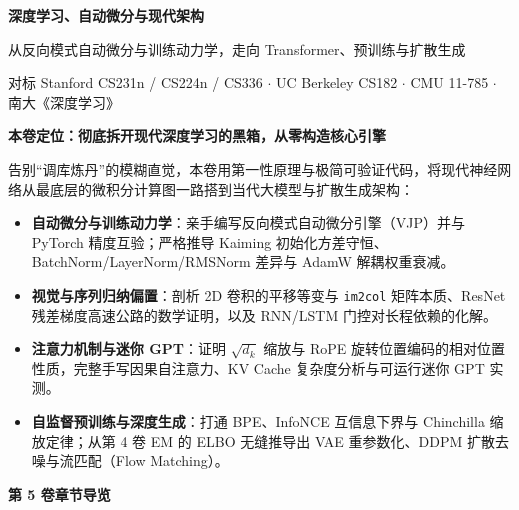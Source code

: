 \documentclass[UTF8,10.5pt,a4paper,oneside,fontset=fandol,scheme=plain]{ctexbook}
\begin{document}
{\fontsize{25}{33}\selectfont\sffamily\bfseries\color{ink}深度学习、自动微分与现代架构}\par
\vspace{2.5mm}
{\large\sffamily\color{teal}从反向模式自动微分与训练动力学，走向 Transformer、预训练与扩散生成}\par
\vspace{4.5mm}
{\small\color{slate}对标 Stanford CS231n / CS224n / CS336 $\cdot$ UC Berkeley CS182 $\cdot$ CMU 11-785 $\cdot$ 南大《深度学习》}\par

\vspace{5.5mm}

\begin{tcolorbox}[
  enhanced,
  colback=tealLight,
  colframe=tealLine,
  borderline west={2.6pt}{0pt}{tealDark},
  arc=2mm,
  boxrule=0.5pt,
  left=4.5mm,right=4.5mm,top=3mm,bottom=3mm
]
\textbf{\sffamily\color{tealDark}本卷定位：彻底拆开现代深度学习的黑箱，从零构造核心引擎}\par\vspace{1.2mm}
\small
告别“调库炼丹”的模糊直觉，本卷用第一性原理与极简可验证代码，将现代神经网络从最底层的微积分计算图一路搭到当代大模型与扩散生成架构：
\begin{itemize}
  \item \textbf{自动微分与训练动力学}：亲手编写反向模式自动微分引擎（VJP）并与 PyTorch 精度互验；严格推导 Kaiming 初始化方差守恒、BatchNorm/LayerNorm/RMSNorm 差异与 AdamW 解耦权重衰减。
  \item \textbf{视觉与序列归纳偏置}：剖析 2D 卷积的平移等变与 \texttt{im2col} 矩阵本质、ResNet 残差梯度高速公路的数学证明，以及 RNN/LSTM 门控对长程依赖的化解。
  \item \textbf{注意力机制与迷你 GPT}：证明 $\sqrt{d_k}$ 缩放与 RoPE 旋转位置编码的相对位置性质，完整手写因果自注意力、KV Cache 复杂度分析与可运行迷你 GPT 实测。
  \item \textbf{自监督预训练与深度生成}：打通 BPE、InfoNCE 互信息下界与 Chinchilla 缩放定律；从第 4 卷 EM 的 ELBO 无缝推导出 VAE 重参数化、DDPM 扩散去噪与流匹配（Flow Matching）。
\end{itemize}
\end{tcolorbox}

\vspace{4.5mm}

\noindent\textbf{\sffamily\color{tealDark}第 5 卷章节导览}
\vspace{1.5mm}
\end{document}
